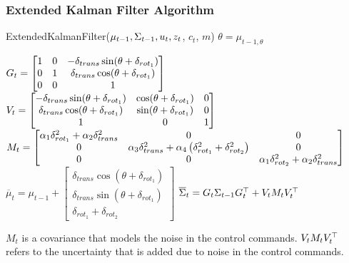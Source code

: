 \begin{frame}
    \frametitle{Extended Kalman Filter Algorithm}
    \footnotesize
    \begin{algorithmic}[1]
    \State ExtendedKalmanFilter({$\mu_{t-1}, \Sigma_{t-1}, u_{t}, z_{t}$, $c_{t}$, $m$})
    \State $\theta = \mu_{t-1,\theta}$
   
    \State $
    G_{t} =
    \begin{bmatrix}
    1 & 0 & -\delta_{trans} \sin(\theta + \delta_{rot_{1}})\\
    0 & 1 & \delta_{trans} \cos(\theta + \delta_{rot_{1}})\\
    0 & 0 & 1\\
    \end{bmatrix}
    $
    \State $
    V_{t} =
    \begin{bmatrix}
    -\delta_{trans} \sin(\theta + \delta _{rot_{1}}) & \cos(\theta + \delta _{rot_{1}}) & 0\\
    \delta _{trans} \cos(\theta + \delta _{rot_{1}}) & \sin(\theta + \delta _{rot _{1}}) & 0\\
    1 & 0 & 1\\
    \end{bmatrix}
    $
    \State $
    M_{t} =
    \begin{bmatrix}
    \alpha_{1}\delta^{2}_{rot_{1}} + \alpha_{2}\delta^{2}_{trans} & 0 & 0\\
    0 & \alpha_{3} \delta^{2}_{trans} + \alpha_{4} \left( \delta^{2}_{rot_{1}} + \delta^{2}_{rot_{2}} \right) & 0\\
    0 & 0 & \alpha_{1}\delta^{2}_{rot_{2}} + \alpha_{2}\delta^{2}_{trans}\\
    \end{bmatrix}
    $
    \State $\overline{\mu}_{t} = \mu_{t-1} +
    \begin{bmatrix}
    \delta_{trans}\cos(\theta+\delta_{rot_{1}}) \\
    \delta_{trans}\sin(\theta+\delta_{rot_{1}}) \\
    \delta_{rot_{1}} + \delta_{rot_{2}}
    \end{bmatrix}$
    \State $\overline{\Sigma}_{t} = G_{t} \Sigma_{t-1} G_{t}^{\top}+V_{t} M_{t} V_{t}^{\top}$
    \end{algorithmic}
    \vspace{1em}
    $M_{t}$ is a covariance that models the noise in the control commands.
    $V_{t} M_{t} V_{t}^{\top}$ refers to the uncertainty that is added due to noise in the control commands.
   
\end{frame}
   
